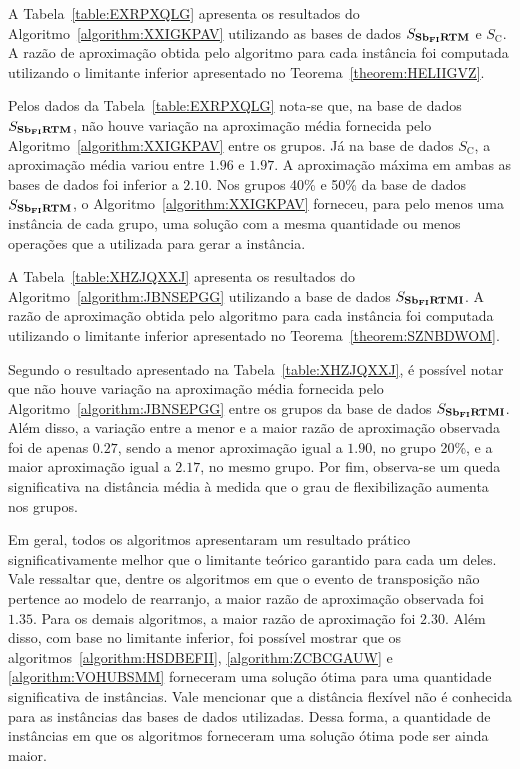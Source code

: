 A Tabela~\ref{table:EXRPXQLG} apresenta os resultados do Algoritmo~\ref{algorithm:XXIGKPAV} utilizando as bases de dados $S_{\textbf{Sb\textsubscript{FI}RTM}}{}$ e $S_{\text{C}}$. A razão de aproximação obtida pelo algoritmo para cada instância foi computada utilizando o limitante inferior apresentado no Teorema~\ref{theorem:HELIIGVZ}.



Pelos dados da Tabela~\ref{table:EXRPXQLG} nota-se que, na base de dados $S_{\textbf{Sb\textsubscript{FI}RTM}}{}$, não houve variação na aproximação média fornecida pelo Algoritmo~\ref{algorithm:XXIGKPAV} entre os grupos. Já na base de dados $S_{\text{C}}$, a aproximação média variou entre $1.96$ e $1.97$. A aproximação máxima em ambas as bases de dados foi inferior a $2.10$. Nos grupos 40\% e 50\% da base de dados $S_{\textbf{Sb\textsubscript{FI}RTM}}{}$, o Algoritmo~\ref{algorithm:XXIGKPAV} forneceu, para pelo menos uma instância de cada grupo, uma solução com a mesma quantidade ou menos operações que a utilizada para gerar a instância.

A Tabela~\ref{table:XHZJQXXJ} apresenta os resultados do Algoritmo~\ref{algorithm:JBNSEPGG} utilizando a base de dados $S_{\textbf{Sb\textsubscript{FI}RTMI}}{}$. A razão de aproximação obtida pelo algoritmo para cada instância foi computada utilizando o limitante inferior apresentado no Teorema~\ref{theorem:SZNBDWOM}.



Segundo o resultado apresentado na Tabela~\ref{table:XHZJQXXJ}, é possível notar que não houve variação na aproximação média fornecida pelo Algoritmo~\ref{algorithm:JBNSEPGG} entre os grupos da base de dados $S_{\textbf{Sb\textsubscript{FI}RTMI}}{}$. Além disso, a variação entre a menor e a maior razão de aproximação observada foi de apenas $0.27$, sendo a menor aproximação igual a $1.90$, no grupo 20\%, e a maior aproximação igual a $2.17$, no mesmo grupo. Por fim, observa-se um queda significativa na distância média à medida que o grau de flexibilização aumenta nos grupos.

Em geral, todos os algoritmos apresentaram um resultado prático significativamente melhor que o limitante teórico garantido para cada um deles. Vale ressaltar que, dentre os algoritmos em que o evento de transposição não pertence ao modelo de rearranjo, a maior razão de aproximação observada foi $1.35$. Para os demais algoritmos, a maior razão de aproximação foi $2.30$. Além disso, com base no limitante inferior, foi possível mostrar que os algoritmos~\ref{algorithm:HSDBEFII}, \ref{algorithm:ZCBCGAUW} e \ref{algorithm:VOHUBSMM} forneceram uma solução ótima para uma quantidade significativa de instâncias. Vale mencionar que a distância flexível não é conhecida para as instâncias das bases de dados utilizadas. Dessa forma, a quantidade de instâncias em que os algoritmos forneceram uma solução ótima pode ser ainda maior. 

